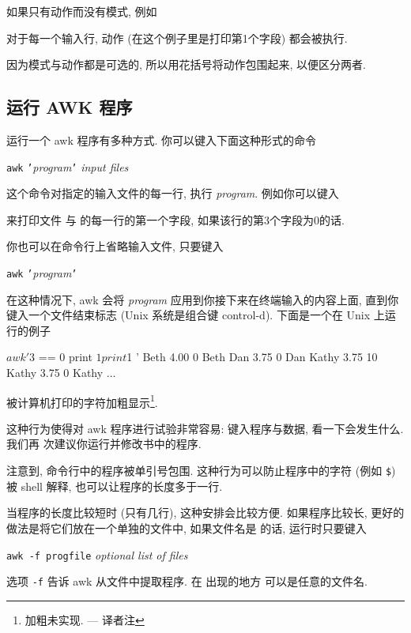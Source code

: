 如果只有动作而没有模式, 例如
对于每一个输入行, 动作 (在这个例子里是打印第1个字段) 都会被执行.

因为模式与动作都是可选的, 所以用花括号将动作包围起来, 以便区分两者.

\subsection{运行 AWK 程序}
\label{running_an_awk_program}

运行一个 awk 程序有多种方式. 你可以键入下面这种形式的命令
\begin{pattern}
    \texttt{awk} \texttt{'}\textit{program}\texttt{'} \textit{input files}
\end{pattern}
这个命令对指定的输入文件的每一行, 执行 \textit{program}. 例如你可以键入
来打印文件  与  的每一行的第一个字段,
如果该行的第3个字段为0的话.

你也可以在命令行上省略输入文件, 只要键入
\begin{pattern}
    \texttt{awk} \texttt{'}\textit{program}\texttt{'}
\end{pattern}
在这种情况下, awk 会将 \textit{program} 应用到你接下来在终端输入的内容上面,
直到你键入一个文件结束标志 (Unix 系统是组合键 control-d). 下面是一个在 Unix
上运行的例子
\begin{shell}
    $ awk '$3 == 0 { print $1 print $1 }'
    Beth    4.00    0
    Beth
    Dan     3.75    0
    Dan
    Kathy   3.75    10
    Kathy   3.75    0
    Kathy
    ...
\end{shell}
被计算机打印的字符加粗显示\footnote{加粗未实现. --- 译者注}.

这种行为使得对 awk 程序进行试验非常容易: 键入程序与数据,
看一下会发生什么. 我们再
次建议你运行并修改书中的程序.

注意到, 命令行中的程序被单引号包围. 这种行为可以防止程序中的字符 (例如
\verb'$') 被 shell 解释, 也可以让程序的长度多于一行.

当程序的长度比较短时 (只有几行), 这种安排会比较方便. 如果程序比较长, 更好的
做法是将它们放在一个单独的文件中, 如果文件名是  的话,
运行时只要键入
\begin{pattern}
    \texttt{awk -f progfile} \textit{optional list of files}
\end{pattern}
选项 \verb'-f' 告诉 awk 从文件中提取程序. 在  出现的地方
可以是任意的文件名.

